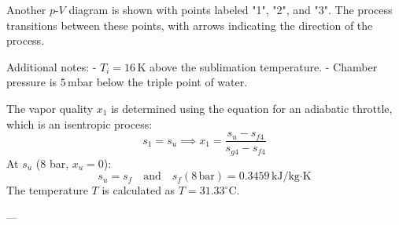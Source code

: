 Another \(p\)-\(V\) diagram is shown with points labeled "1", "2", and "3". The process transitions between these points, with arrows indicating the direction of the process.  

Additional notes:  
- \(T_i = 16 \, \text{K}\) above the sublimation temperature.  
- Chamber pressure is \(5 \, \text{mbar}\) below the triple point of water.

The vapor quality \( x_1 \) is determined using the equation for an adiabatic throttle, which is an isentropic process:  
\[
s_1 = s_u \implies x_1 = \frac{s_u - s_{f4}}{s_{g4} - s_{f4}}
\]  
At \( s_u \) (8 bar, \( x_u = 0 \)):  
\[
s_u = s_f \quad \text{and} \quad s_f (8 \, \text{bar}) = 0.3459 \, \text{kJ/kg·K}
\]  
The temperature \( T \) is calculated as \( T = 31.33^\circ\text{C} \).

---